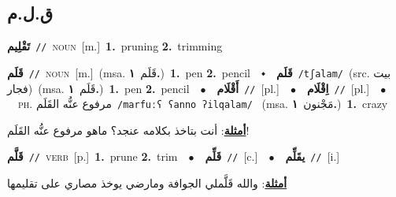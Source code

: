 \documentclass[10pt,a4paper,twoside]{article} %
\begin{document}
\begin{multicols}{2}
\vspace{-3mm}
\subsection*{\color{blue}\foreignlanguage{arabic}{ق.ل.م}\color{blue}{}} 

{\setlength\topsep{0pt}\textbf{\foreignlanguage{arabic}{تَقْلِيم}}\ {\color{gray}\texttt{//}\color{black}}\ \textsc{noun}\ [m.]\ \textbf{1.}~pruning  \textbf{2.}~trimming\ } \vspace{2mm}

{\setlength\topsep{0pt}\textbf{\foreignlanguage{arabic}{قَلَم}}\ {\color{gray}\texttt{//}\color{black}}\ \textsc{noun}\ [m.]\ \color{gray}(msa. \foreignlanguage{arabic}{قَلَم}~\foreignlanguage{arabic}{\textbf{١.}})\color{black}\ \textbf{1.}~pen  \textbf{2.}~pencil\ \ $\smblkdiamond$\ \ \setlength\topsep{0pt}\textbf{\foreignlanguage{arabic}{قَلَم}}\ {\color{gray}\texttt{/tʃalam/}\color{black}}\ (src. \color{gray}\foreignlanguage{arabic}{بيت فجار}\color{black})\ \color{gray}(msa. \foreignlanguage{arabic}{قَلَم}~\foreignlanguage{arabic}{\textbf{١.}})\color{black}\ \textbf{1.}~pen  \textbf{2.}~pencil\ \ $\bullet$\ \ \setlength\topsep{0pt}\textbf{\foreignlanguage{arabic}{أَقْلَام}}\ {\color{gray}\texttt{//}\color{black}}\ [pl.]\ \ $\bullet$\ \ \setlength\topsep{0pt}\textbf{\foreignlanguage{arabic}{اِقْلَام}}\ {\color{gray}\texttt{//}\color{black}}\ [pl.]\ \ $\bullet$\ \ \textsc{ph.} \color{gray} \foreignlanguage{arabic}{مرفوع عنُّه القَلَم}\color{black}\ {\color{gray}\texttt{/{\sffamily marfuːʕ ʕanno ʔilqalam}/}\color{black}}\ \color{gray} (msa. \foreignlanguage{arabic}{مَجْنون}~\foreignlanguage{arabic}{\textbf{١.}})\color{black}\ \textbf{1.}~crazy\  \begin{flushright}\color{gray}\foreignlanguage{arabic}{\textbf{\underline{\foreignlanguage{arabic}{أمثلة}}}: أنت بتاخذ بكلامه عنجد؟ ماهو مرفوع عنُّه القَلَم!}\end{flushright}\color{black}} \vspace{2mm}

{\setlength\topsep{0pt}\textbf{\foreignlanguage{arabic}{قَلَّم}}\ {\color{gray}\texttt{//}\color{black}}\ \textsc{verb}\ [p.]\ \textbf{1.}~prune  \textbf{2.}~trim\ \ $\bullet$\ \ \setlength\topsep{0pt}\textbf{\foreignlanguage{arabic}{قَلِّم}}\ {\color{gray}\texttt{//}\color{black}}\ [c.]\ \ $\bullet$\ \ \setlength\topsep{0pt}\textbf{\foreignlanguage{arabic}{يقَلِّم}}\ {\color{gray}\texttt{//}\color{black}}\ [i.]\  \begin{flushright}\color{gray}\foreignlanguage{arabic}{\textbf{\underline{\foreignlanguage{arabic}{أمثلة}}}: والله قَلَّملي الجوافة ومارضي يوخذ مصاري على تقليمها}\end{flushright}\color{black}} \vspace{2mm}


\end{multicols}
\end{document}
